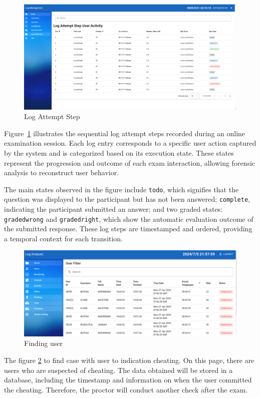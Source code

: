 \begin{figure}[H] 
	\centering
	\includegraphics[width=18cm]{figure/log_attempt_step.png}
	\caption{Log Attempt Step}
	\label{fig:log-attempt-step}
\end{figure}
Figure~\ref{fig:log-attempt-step} illustrates the sequential log attempt steps recorded during an online examination session. Each log entry corresponds to a specific user action captured by the system and is categorized based on its execution state. These states represent the progression and outcome of each exam interaction, allowing forensic analysis to reconstruct user behavior.

The main states observed in the figure include \texttt{todo}, which signifies that the question was displayed to the participant but has not been answered; \texttt{complete}, indicating the participant submitted an answer; and two graded states: \texttt{gradedwrong} and \texttt{gradedright}, which show the automatic evaluation outcome of the submitted response. These log steps are timestamped and ordered, providing a temporal context for each transition.
\begin{figure}[H] 
	\centering
	\includegraphics[width=18cm]{figure/findings_20240809_215805.png}
	\caption{Finding user}
	\label{fig:findings-user}
\end{figure}

The figure \ref{fig:findings-user} to find case with user to indication cheating. On this page, there are users who are suspected of cheating. The data obtained will be stored in a database, including the timestamp and information on when the user committed the cheating. Therefore, the proctor will conduct another check after the exam.

